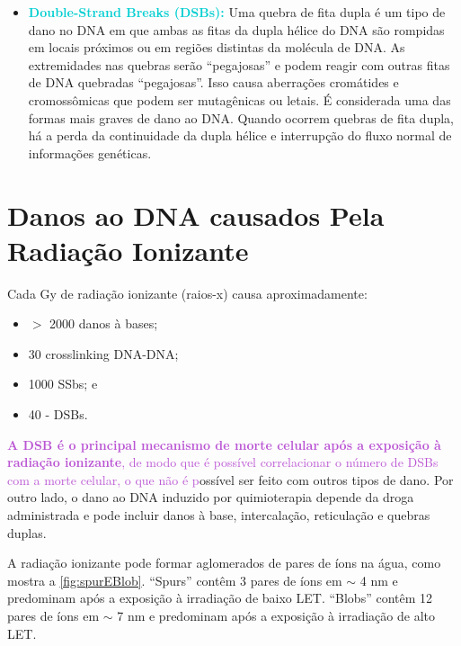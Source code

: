 \documentclass[11pt,a4paper]{article}
\begin{document}
\begin{itemize}[label=\textcolor{CarnationPink}{$\blacktriangleright$}]
    \item \textcolor{DarkTurquoise}{\textbf{Double-Strand Breaks (DSBs):}} Uma quebra de fita dupla é um tipo de dano no DNA em que ambas as fitas da dupla hélice do DNA são rompidas em locais próximos ou em regiões distintas da molécula de DNA. As extremidades nas quebras serão “pegajosas” e podem reagir com outras fitas de DNA quebradas “pegajosas”. Isso causa aberrações cromátides e cromossômicas que podem ser mutagênicas ou letais. É considerada uma das formas mais graves de dano ao DNA. Quando ocorrem quebras de fita dupla, há a perda da continuidade da dupla hélice e interrupção do fluxo normal de informações genéticas.
	\end{itemize}

\section{Danos ao DNA causados Pela Radiação Ionizante}

	Cada Gy de radiação ionizante (raios-x) causa aproximadamente:

	\begin{itemize}[label=\textcolor{CarnationPink}{$\blacktriangleright$}]
		\item $>$ 2000 danos à bases;
		\item 30 crosslinking DNA-DNA;
		\item 1000 SSbs; e
		\item 40 - DSBs.
	\end{itemize}

	\textcolor{MediumOrchid}{\textbf{A DSB é o principal mecanismo de morte celular após a exposição à radiação ionizante}, de modo que é possível correlacionar o número de DSBs com a morte celular, o que não é p}ossível ser feito com outros tipos de dano. Por outro lado, o dano ao DNA induzido por quimioterapia depende da droga administrada e pode incluir danos à base, intercalação, reticulação e quebras duplas. 

	A radiação ionizante pode formar aglomerados de pares de íons na água, como mostra a \ref{fig:spurEBlob}. “Spurs” contêm 3 pares de íons em $\sim$ 4 nm e predominam após a exposição à irradiação de baixo LET. “Blobs” contêm 12 pares de íons em $\sim$ 7 nm e predominam após a exposição à irradiação de alto LET.
\end{document}
